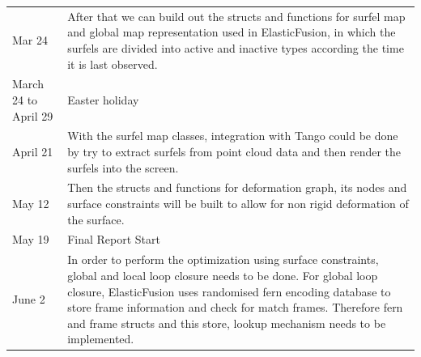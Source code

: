 \documentclass[12pt,twoside]{article}
\begin{document}
\begin{table}[]
\begin{tabular}{ll}
Mar 24                      & After that we can build out the structs and functions for surfel map and global map representation used in ElasticFusion, in which the surfels are divided into active and inactive types according the time it is last observed.                                                                                                                                    \\
March 24 to April 29        & Easter holiday                                                                                                                                                                                                                                                                                                                                                       \\
April 21                    & With the surfel map classes, integration with Tango could be done by try to extract surfels from point cloud data and then render the surfels into the screen.                                                                                                                                                                                                       \\
May 12                      & Then the structs and functions for deformation graph, its nodes and surface constraints will be built to allow for non rigid deformation of the surface.                                                                                                                                                                                                             \\
May 19                      & Final Report Start                                                                                                                                                                                                                                                                                                                                                   \\ \cline{2-2} 
\multicolumn{1}{l|}{June 2} & \multicolumn{1}{l|}{In order to perform the optimization using surface constraints, global and local loop closure needs to be done. For global loop closure, ElasticFusion uses randomised fern encoding database to store frame information and check for match frames. Therefore fern and frame structs and this store, lookup mechanism needs to be implemented.} \\ \cline{2-2} 

\end{tabular}
\end{table}
\end{document}
